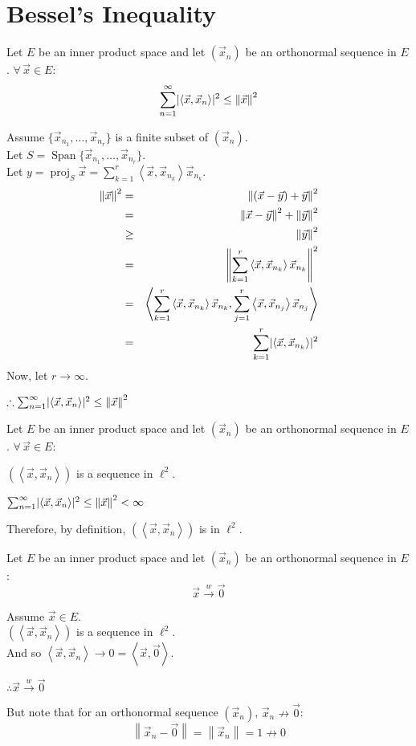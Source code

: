 \documentclass[letterpaper,12pt,fleqn]{article}
\newcommand{\vx}{\vec{x}}
\newcommand{\vy}{\vec{y}}
\newcommand{\vo}{\vec{0}}
\newcommand{\norm}[1]{\left\|#1\right\|}
\newcommand{\inner}[1]{\left<#1\right>}
\newcommand{\weak}{\overset{w}{\longrightarrow}}
\DeclareMathOperator{\spn}{Span}
\DeclareMathOperator{\proj}{proj}
\begin{document}
\section*{Bessel's Inequality}

\begin{theorem}[Bessel]
  Let $E$ be an inner product space and let $(\vx_n)$ be an orthonormal
  sequence in $E$. $\forall\,\vx\in E$:
  \[\sum_{n=1}^{\infty}\abs{\inner{\vx,\vx_n}}^2\le\norm{\vx}^2\]
\end{theorem}

\begin{theproof}
  Assume $\{\vx_{n_1},\ldots,\vx_{n_r}\}$ is a finite subset of $(\vx_n)$. \\
  Let $S=\spn\{\vx_{n_1},\ldots,\vx_{n_r}\}$. \\
  Let $y=\proj_S\vx=\sum_{k=1}^r\inner{\vx,\vx_{n_k}}\vx_{n_k}$. \\
  \begin{eqnarray*}
    \norm{\vx}^2 &=& \norm{(\vx-\vy)+\vy}^2 \\
    &=& \norm{\vx-\vy}^2+\norm{\vy}^2 \\
    &\ge& \norm{\vy}^2 \\
    &=& \norm{\sum_{k=1}^r\inner{\vx,\vx_{n_k}}\vx_{n_k}}^2 \\
    &=& \inner{\sum_{k=1}^r\inner{\vx,\vx_{n_k}}\vx_{n_k},
      \sum_{j=1}^r\inner{\vx,\vx_{n_j}}\vx_{n_j}} \\
    &=& \sum_{k=1}^r\abs{\inner{\vx,\vx_{n_k}}}^2
  \end{eqnarray*}
  Now, let $r\to\infty$.

  $\therefore\sum_{n=1}^{\infty}\abs{\inner{\vx,\vx_n}}^2\le\norm{\vx}^2$
\end{theproof}

\begin{corollary}
  Let $E$ be an inner product space and let $(\vx_n)$ be an orthonormal
  sequence in $E$. $\forall\,\vx\in E$:

  \qquad$(\inner{\vx,\vx_n})$ is a sequence in $\ell^2$.
\end{corollary}

\begin{theproof}
  $\sum_{n=1}^{\infty}\abs{\inner{\vx,\vx_n}}^2\le\norm{\vx}^2<\infty$

  Therefore, by definition, $(\inner{\vx,\vx_n})$ is in $\ell^2$.
\end{theproof}

\newpage

\begin{corollary}
  Let $E$ be an inner product space and let $(\vx_n)$ be an orthonormal
  sequence in $E$:
  \[\vx\weak\vo\]
\end{corollary}

\begin{theproof}
  Assume $\vx\in E$. \\
  $(\inner{\vx,\vx_n})$ is a sequence in $\ell^2$. \\
  And so $\inner{\vx,\vx_n}\to0=\inner{\vx,\vo}$.

  $\therefore\vx\weak\vo$
\end{theproof}

But note that for an orthonormal sequence $(\vx_n)$, $\vx_n\not\to\vo$:
\[\norm{\vx_n-\vo}=\norm{\vx_n}=1\not\to0\]
\end{document}
